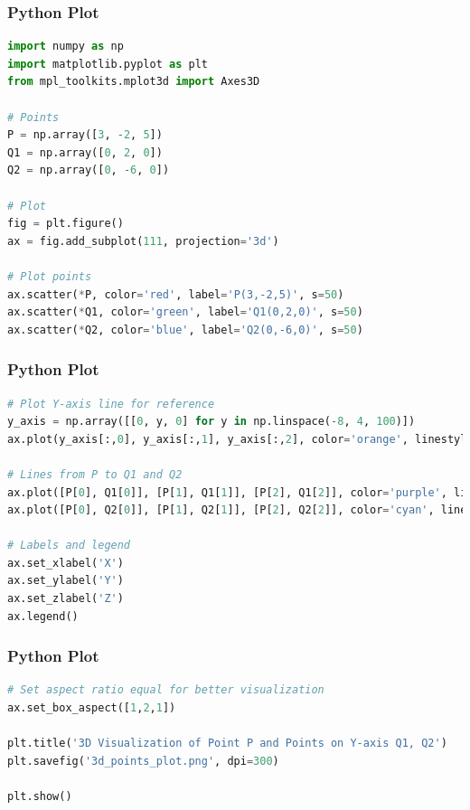 \documentclass{beamer}
\theoremstyle{remark}
\numberwithin{equation}{section}
\numberwithin{equation}{section}
\begin{document}
\begin{frame}[fragile]
\frametitle{Python Plot }
\begin{lstlisting}[language=Python]
import numpy as np
import matplotlib.pyplot as plt
from mpl_toolkits.mplot3d import Axes3D

# Points
P = np.array([3, -2, 5])
Q1 = np.array([0, 2, 0])
Q2 = np.array([0, -6, 0])

# Plot
fig = plt.figure()
ax = fig.add_subplot(111, projection='3d')

# Plot points
ax.scatter(*P, color='red', label='P(3,-2,5)', s=50)
ax.scatter(*Q1, color='green', label='Q1(0,2,0)', s=50)
ax.scatter(*Q2, color='blue', label='Q2(0,-6,0)', s=50)


\end{lstlisting}
\end{frame}
\begin{frame}[fragile]
\frametitle{Python Plot }
\begin{lstlisting}[language=Python]
# Plot Y-axis line for reference
y_axis = np.array([[0, y, 0] for y in np.linspace(-8, 4, 100)])
ax.plot(y_axis[:,0], y_axis[:,1], y_axis[:,2], color='orange', linestyle='--', label='Y-axis')

# Lines from P to Q1 and Q2
ax.plot([P[0], Q1[0]], [P[1], Q1[1]], [P[2], Q1[2]], color='purple', linestyle='-', label='Distance PQ1')
ax.plot([P[0], Q2[0]], [P[1], Q2[1]], [P[2], Q2[2]], color='cyan', linestyle='-', label='Distance PQ2')

# Labels and legend
ax.set_xlabel('X')
ax.set_ylabel('Y')
ax.set_zlabel('Z')
ax.legend()


\end{lstlisting}
\end{frame}
\begin{frame}[fragile]
\frametitle{Python Plot }
\begin{lstlisting}[language=Python]
# Set aspect ratio equal for better visualization
ax.set_box_aspect([1,2,1])

plt.title('3D Visualization of Point P and Points on Y-axis Q1, Q2')
plt.savefig('3d_points_plot.png', dpi=300)

plt.show()
\end{lstlisting}
\end{frame}
\end{document}
